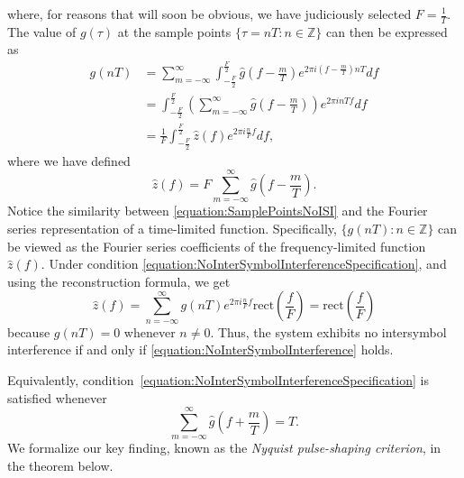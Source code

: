 where, for reasons that will soon be obvious, we have judiciously selected $F = \frac{1}{T}$.
The value of $g(\tau)$ at the sample points $\{ \tau = nT : n \in \mathbb{Z} \}$ can then be expressed as
\begin{equation} \label{equation:SamplePointsNoISI}
\begin{split}
g(nT) &= \sum_{m = -\infty}^{\infty} \int_{-\frac{F}{2}}^{\frac{F}{2}}
\hat{g} \left( f - \frac{m}{T} \right) e^{2 \pi i \left( f - \frac{m}{T} \right) nT} df \\
&= \int_{-\frac{F}{2}}^{\frac{F}{2}}
\left( \sum_{m = -\infty}^{\infty} \hat{g} \left( f - \frac{m}{T} \right) \right)
e^{2 \pi i n T f} df \\
&= \frac{1}{F} \int_{-\frac{F}{2}}^{\frac{F}{2}}
\hat{z} (f) e^{2 \pi i \frac{n}{F} f} df ,
\end{split}
\end{equation}
where we have defined
\begin{equation*}
\hat{z}(f) = F \sum_{m = -\infty}^{\infty} \hat{g} \left( f - \frac{m}{T} \right) .
\end{equation*}
Notice the similarity between \eqref{equation:SamplePointsNoISI} and the Fourier series representation of a time-limited function.
Specifically, $\{ g(nT) : n \in \mathbb{Z} \}$ can be viewed as the Fourier series coefficients of the frequency-limited function $\hat{z}(f)$.
Under condition \eqref{equation:NoInterSymbolInterferenceSpecification}, and using the reconstruction formula, we get
\begin{equation} \label{equation:NoInterSymbolInterference}
\hat{z}(f) = \sum_{n = -\infty}^{\infty} g(nT) e^{2 \pi i \frac{n}{F} f}
\mathrm{rect} \left( \frac{f}{F} \right)
= \mathrm{rect} \left( \frac{f}{F} \right)
\end{equation}
because $g(nT) = 0$ whenever $n \neq 0$.
Thus, the system exhibits no intersymbol interference if and only if \eqref{equation:NoInterSymbolInterference} holds.

Equivalently, condition~\eqref{equation:NoInterSymbolInterferenceSpecification} is satisfied whenever
\begin{equation} \label{equation:NyquistNoISI}
\sum_{m = -\infty}^{\infty} \hat{g} \left( f + \frac{m}{T} \right)
= T .
\end{equation}
We formalize our key finding, known as the \emph{Nyquist pulse-shaping criterion}, in the theorem below.

